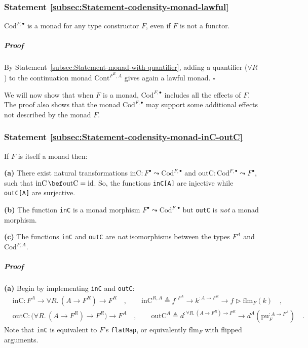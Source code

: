 \subsubsection{Statement \label{subsec:Statement-codensity-monad-lawful}\ref{subsec:Statement-codensity-monad-lawful}}

$\text{Cod}^{F,\bullet}$ is a monad for any type constructor $F$,
even if $F$ is not a functor.

\subparagraph{Proof}

By Statement~\ref{subsec:Statement-monad-with-quantifier}, adding
a quantifier ($\forall R$) to the continuation monad $\text{Cont}^{F^{R},A}$
gives again a lawful monad. $\square$

We will now show that when $F$ is a monad, $\text{Cod}^{F,\bullet}$
includes all the effects of $F$. The proof also shows that the monad
$\text{Cod}^{F,\bullet}$ may support some additional effects not
described by the monad $F$.

\subsubsection{Statement \label{subsec:Statement-codensity-monad-inC-outC}\ref{subsec:Statement-codensity-monad-inC-outC}}

If $F$ is itself a monad then:

\textbf{(a)} There exist natural transformations $\text{inC}:F^{\bullet}\leadsto\text{Cod}^{F,\bullet}$
and $\text{outC}:\text{Cod}^{F,\bullet}\leadsto F^{\bullet}$, such
that $\text{inC}\,\bef\text{outC}=\text{id}$. So, the functions \lstinline!inC[A]!
are injective while \lstinline!outC[A]! are surjective.

\textbf{(b)} The function \lstinline!inC! is a monad morphism $F^{\bullet}\leadsto\text{Cod}^{F,\bullet}$
but \lstinline!outC! is \emph{not} a monad morphism.

\textbf{(c)} The functions \lstinline!inC! and \lstinline!outC!
are \emph{not} isomorphisms between the types $F^{A}$ and $\text{Cod}^{F,A}$.

\subparagraph{Proof}

\textbf{(a)} Begin by implementing \lstinline!inC! and \lstinline!outC!:
\begin{align*}
 & \text{inC}:F^{A}\rightarrow\forall R.\,(A\rightarrow F^{R})\rightarrow F^{R}\quad,\quad\quad\text{inC}^{R,A}\triangleq f^{:F^{A}}\rightarrow k^{:A\rightarrow F^{R}}\rightarrow f\triangleright\text{flm}_{F}(k)\quad,\\
 & \text{outC}:\big(\forall R.\,(A\rightarrow F^{R})\rightarrow F^{R}\big)\rightarrow F^{A}\quad,\quad\quad\text{outC}^{A}\triangleq d^{:\forall R.\,(A\rightarrow F^{R})\rightarrow F^{R}}\rightarrow d^{A}(\text{pu}_{F}^{:A\rightarrow F^{A}})\quad.
\end{align*}
Note that \lstinline!inC! is equivalent to $F$\textsf{'}s \lstinline!flatMap!,
or equivalently $\text{flm}_{F}$ with flipped arguments.

